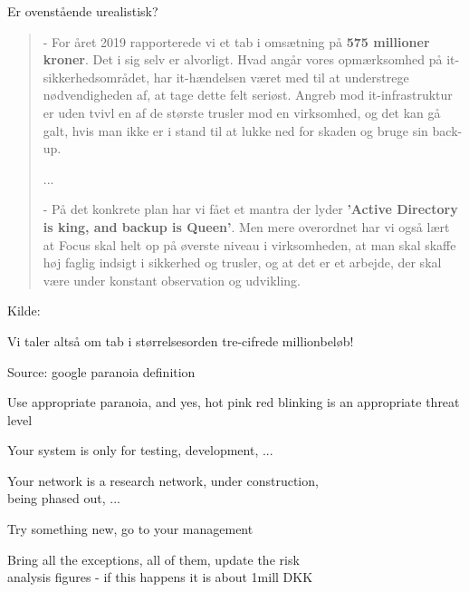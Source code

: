 \documentclass[Screen16to9,17pt]{foils}
\begin{document}
\begin{list2}
\item Er ovenstående urealistisk?
\end{list2}



\begin{quote}
- For året 2019 rapporterede vi et tab i omsætning på {\bf 575 millioner kroner}. Det i sig selv er alvorligt. Hvad angår vores opmærksomhed på it-sikkerhedsområdet, har it-hændelsen været med til at understrege nødvendigheden af, at tage dette felt seriøst. Angreb mod it-infrastruktur er uden tvivl en af de største trusler mod en virksomhed, og det kan gå galt, hvis man ikke er i stand til at lukke ned for skaden og bruge sin back-up.

...

- På det konkrete plan har vi fået et mantra der lyder {\bf ’Active Directory is king, and backup is Queen’}. Men mere overordnet har vi også lært at Focus skal helt op på øverste niveau i virksomheden, at man skal skaffe høj faglig indsigt i sikkerhed og trusler, og at det er et arbejde, der skal være under konstant observation og udvikling.

\end{quote}
Kilde: 


\begin{list2}
\item Vi taler altså om tab i størrelsesorden tre-cifrede millionbeløb!
\end{list2}



Source: google paranoia definition

Use appropriate paranoia, and yes, hot pink red blinking is an appropriate threat level



Your system is only for testing, development, ...

Your network is a research network, under construction, \\
being phased out, ...

Try something new, go to your management

Bring all the exceptions, all of them, update the risk \\
analysis figures - if this happens it is about 1mill DKK
\end{document}
